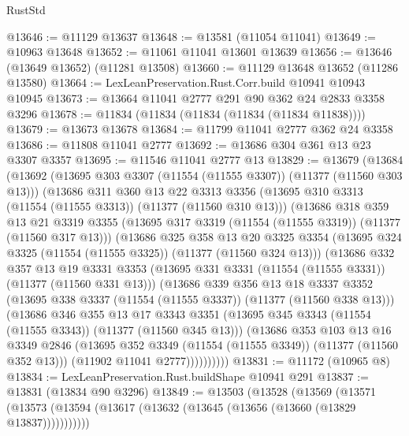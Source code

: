 \begin{lexlean}{RustStd}
\begin{coremodule}
{\begin{coremodule}
{{{{{{{{{{{{{{{{{{{{{{{{{{{{{{{{{@13646 := @11129 @13637
@13648 := @13581 (@11054 @11041)
@13649 := @10963 @13648
@13652 := @11061 @11041 @13601 @13639
@13656 := @13646 (@13649 @13652) (@11281 @13508)
@13660 := @11129 @13648 @13652 (@11286 @13580)
@13664 := LexLeanPreservation.Rust.Corr.build @10941 @10943 @10945
@13673 := @13664 @11041 @2777 @291 @90 @362 @24 @2833 @3358 @3296
@13678 := @11834 (@11834 (@11834 (@11834 (@11834 @11838))))
@13679 := @13673 @13678
@13684 := @11799 @11041 @2777 @362 @24 @3358
@13686 := @11808 @11041 @2777
@13692 := @13686 @304 @361 @13 @23 @3307 @3357
@13695 := @11546 @11041 @2777 @13
@13829 := @13679
    (@13684
      (@13692
        (@13695 @303 @3307 (@11554 (@11555 @3307)) (@11377 (@11560 @303 @13)))
        (@13686
          @311
          @360
          @13
          @22
          @3313
          @3356
          (@13695 @310 @3313 (@11554 (@11555 @3313)) (@11377 (@11560 @310 @13)))
          (@13686
            @318
            @359
            @13
            @21
            @3319
            @3355
            (@13695 @317 @3319 (@11554 (@11555 @3319)) (@11377 (@11560 @317 @13)))
            (@13686
              @325
              @358
              @13
              @20
              @3325
              @3354
              (@13695 @324 @3325 (@11554 (@11555 @3325)) (@11377 (@11560 @324 @13)))
              (@13686
                @332
                @357
                @13
                @19
                @3331
                @3353
                (@13695 @331 @3331 (@11554 (@11555 @3331)) (@11377 (@11560 @331 @13)))
                (@13686
                  @339
                  @356
                  @13
                  @18
                  @3337
                  @3352
                  (@13695 @338 @3337 (@11554 (@11555 @3337)) (@11377 (@11560 @338 @13)))
                  (@13686
                    @346
                    @355
                    @13
                    @17
                    @3343
                    @3351
                    (@13695 @345 @3343 (@11554 (@11555 @3343)) (@11377 (@11560 @345 @13)))
                    (@13686
                      @353
                      @103
                      @13
                      @16
                      @3349
                      @2846
                      (@13695 @352 @3349 (@11554 (@11555 @3349)) (@11377 (@11560 @352 @13)))
                      (@11902 @11041 @2777))))))))))
@13831 := @11172 (@10965 @8)
@13834 := LexLeanPreservation.Rust.buildShape @10941 @291
@13837 := @13831 (@13834 @90 @3296)
@13849 := @13503
    (@13528
      (@13569
        (@13571 (@13573 (@13594 (@13617 (@13632 (@13645 (@13656 (@13660 (@13829 @13837)))))))))))
}}}}}}}}}}}}}}}}}}}}}}}}}}}}}}}}}
\end{coremodule}}
\end{coremodule}
\end{lexlean}
